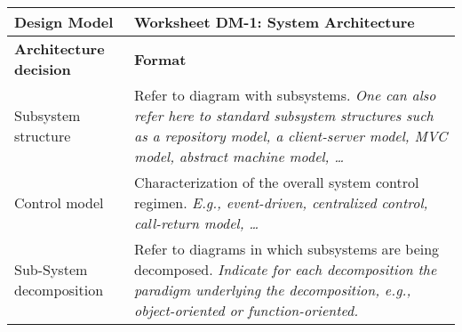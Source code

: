 \begin{tabular}{%
	|>{\colleft}p{3cm}%
	|>{\colleft}p{8cm}|}
\hline
\bf Design Model 	& \bf Worksheet DM-1: System Architecture \\
\hline\hline
\bf Architecture decision	& \bf Format \\ 
\hline
{\sc Subsystem structure}	& 
Refer to diagram with subsystems. \newline 
\em One can also refer here to standard subsystem structures such as a
repository model, a client-server model, MVC model, abstract machine
model, \ldots \\
\hline
{\sc Control model} &
Characterization of the overall system control regimen. \newline
 \em E.g., event-driven, centralized control, call-return model, \ldots \\
\hline
{\sc Sub-System decomposition} &
Refer to diagrams in which subsystems are being
decomposed. \newline
\em Indicate for each decomposition the paradigm
underlying the decomposition, e.g., object-oriented or
function-oriented. \\
\hline
\end{tabular}
